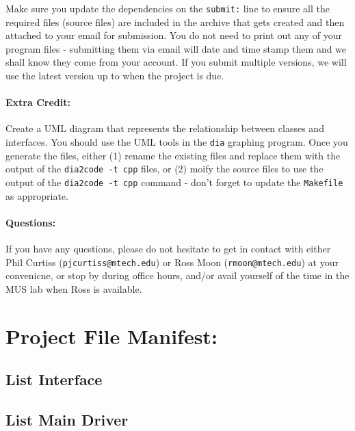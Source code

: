 \documentclass[10pt,letterpaper]{article}
\newcounter{x}\setcounter{x}{1}
\begin{document}
Make sure you update the dependencies on the \verb|submit:| line to ensure all the required files (source files) are included in the archive that gets created and then attached to your email for submission. You do not need to print out any of your program files - submitting them via email will date and time stamp them and we shall know they come from your account. If you submit multiple versions, we will use the latest version up to when the project is due. 

\paragraph{Extra Credit:} Create a UML diagram that represents the relationship between classes and interfaces. You should use the UML tools in the  \verb|dia| graphing program. Once you generate the files, either (1) rename the existing files and replace them with the output of the \verb|dia2code -t cpp| files, or (2) moify the source files to use the output of the \verb|dia2code -t cpp| command - don't forget to update the \verb|Makefile| as appropriate. 
 
\paragraph{Questions:} If you have any questions, please do not hesitate to get in contact with either Phil Curtiss (\verb|pjcurtiss@mtech.edu|) or Ross Moon (\verb|rmoon@mtech.edu|) at your convenicne, or stop by during office hours, and/or avail yourself of the time in the MUS lab when Ross is available. 

\newpage
\section*{Project File Manifest:}

\subsection*{List Interface}



\noindent\hrulefill

\subsection*{List Main Driver}


\end{document}
